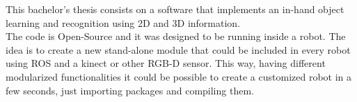This bachelor's thesis consists on a software that implements an in-hand object learning and recognition using 2D and 3D information. 
\\

The code is Open-Source and it was designed to be running inside a robot. The idea is to create a new stand-alone module that could be included in every robot using ROS and a kinect or other RGB-D sensor. This way, having different modularized functionalities it could be possible to create a customized robot in a few seconds, just importing packages and compiling them. 
\\[1cm]